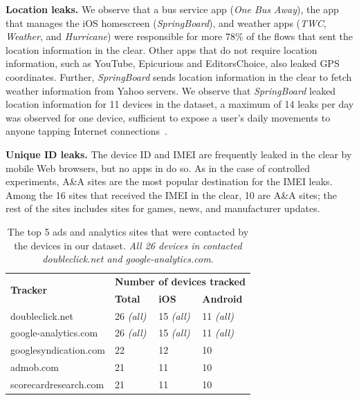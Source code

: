\noindent\textbf{Location leaks.} We observe that a bus service app (\emph{One Bus Away}), the
app that manages the iOS homescreen (\emph{SpringBoard}), and
weather apps (\emph{TWC}, \emph{Weather}, and \emph{Hurricane})
were responsible for more 78\% of the flows that sent the location
information in the clear. Other apps that do not require location information, 
such as YouTube, Epicurious and EditorsChoice, also leaked GPS coordinates.
Further, \emph{SpringBoard} sends location information in the clear to fetch weather information from Yahoo servers. 
We observe that \emph{SpringBoard} leaked location information for 11 devices in the \mobWild dataset, a maximum of 14 leaks per day was observed for one device, sufficient to expose a user's daily movements to anyone tapping Internet connections~\cite{nsa:globaltracking}. 


\noindent\textbf{Unique ID leaks.} The device ID and IMEI are frequently leaked 
in the clear by mobile Web browsers, but no apps in \mobWild do so.  
As in the case of controlled experiments, A\&A sites are the most popular
destination for the IMEI leaks.  Among the 16 sites that received 
the IMEI in the clear, 10 are A\&A sites;
the rest of the sites includes sites for games, news, and manufacturer
updates.

\begin{table}
\centering
\begin{small}
\begin{tabular}{|p{}|p{}|p{}|p{}|}
\hline
\multirow{2}{*}{\bf Tracker} & \multicolumn{3}{c|}{\bf Number of devices tracked}\tabularnewline
\cline{2-4}
                      &  {\bf Total} & {\bf iOS} & {\bf Android} \tabularnewline
\hline
doubleclick.net       & 26 {\em(all)} & 15 {\em(all)} & 11 {\em(all)} \tabularnewline
\hline
google-analytics.com  & 26 {\em(all)} & 15 {\em(all)}  & 11 {\em(all)} \tabularnewline
\hline
googlesyndication.com & 22 & 12 & 10 \tabularnewline
\hline
admob.com             & 21 & 11 & 10 \tabularnewline
\hline
scorecardresearch.com &  21 & 11 & 10 \tabularnewline
\hline
\end{tabular}
\end{small}
\caption{The top 5 ads and analytics sites that were contacted by the devices in our dataset.
\emph{All 26 devices in} \mobWild \emph{contacted doubleclick.net and google-analytics.com}.}
\vspace{\postfigspace}
\label{tab:top-trackers}
\end{table}

